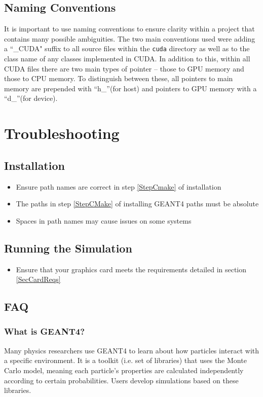 \documentclass[12pt]{article}
\begin{document}
\subsection{Naming Conventions} %
It is important to use naming conventions to ensure clarity within a project that contains many possible ambiguities. The two main conventions used were adding a ``\_CUDA" suffix to all source files within the \texttt{cuda} directory as well as to the class name of any classes implemented in CUDA. In addition to this, within all CUDA files there are two main types of pointer -- those to GPU memory and those to CPU memory. To distinguish between these, all pointers to main memory are prepended with ``h\_''(for host) and pointers to GPU memory with a ``d\_''(for device).

\section{Troubleshooting}\label{SecTroubleshooting} %
\subsection{Installation} %
\begin{itemize}
\item Ensure path names are correct in step \ref{StepCmake} of installation
\item The paths in step \ref{StepCMake} of installing GEANT4 paths must be absolute
\item Spaces in path names may cause issues on some systems
\end{itemize}

\subsection{Running the Simulation} %
\begin{itemize}
\item Ensure that your graphics card meets the requirements detailed in section \ref{SecCardReqs}
\end{itemize}

\subsection{FAQ} %
\subsubsection{What is GEANT4?}\label{SecBackground}
Many physics researchers use GEANT4 to learn about how particles interact with a specific environment. It is a toolkit (i.e. set of libraries) that uses the Monte Carlo model, meaning each particle's properties are calculated independently according to certain probabilities. Users develop simulations based on these libraries.
\end{document}

